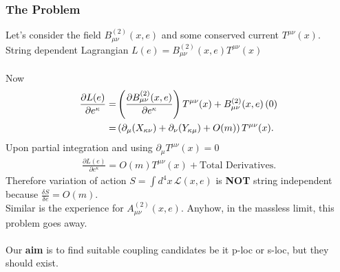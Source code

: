 \documentclass[12pt,a4paper]{article}
\numberwithin{equation}{section}
\begin{document}
\subsubsection{The Problem}
Let's consider the field $B^{(2)}_{\mu\nu}(x,e)$ and some conserved current $T^{\mu\nu}(x)$. \\
String dependent Lagrangian $L(e)=B^{(2)}_{\mu\nu}(x,e)T^{\mu\nu}(x)$\\\\
Now
\begin{align}
\frac{\partial L(e)}{\partial e^\kappa}=&\left(\frac{\partial B^{(2)}_{\mu\nu}(x,e)}{\partial e^\kappa}\right)T^{\mu\nu}(x)+B^{(2)}_{\mu\nu}(x,e)\left(0\right)\notag\\
=&\left(\partial_\mu(X_{\kappa\nu})+\partial_\nu(Y_{\kappa\mu})+O(m)\right)T^{\mu\nu}(x).
\end{align} 
Upon partial integration and using $\partial_\mu T^{\mu\nu}(x)=0$
\begin{align}
\frac{\partial L(e)}{\partial e^\kappa}=O(m)T^{\mu\nu}(x) + \text{Total Derivatives}.
\end{align}
Therefore variation of action $S=\int d^4x\,\mathcal{L}(x,e)$ is \textbf{\textcolor{blue!50!black}{NOT}} string independent because $\frac{\delta S}{\delta e}=O(m)$. \\
Similar is the experience for $A^{(2)}_{\mu\nu}(x,e)$.
Anyhow, in the massless limit, this problem goes away. \\\\
Our \textbf{\textcolor{blue!50!black}{aim}} is to find suitable coupling candidates be it p-loc or s-loc, but they should exist.
\end{document}
